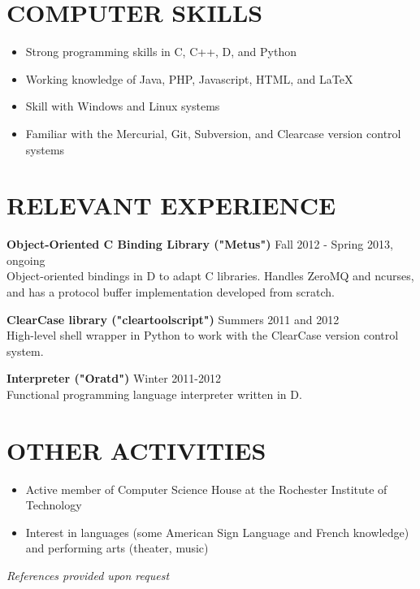 \documentclass[line]{res}
\begin{document}
\begin{resume}
\section{COMPUTER SKILLS}

	\begin{itemize}[leftmargin=10pt]
	\item Strong programming skills in C, C++, D, and Python
	\item Working knowledge of Java, PHP, Javascript, HTML, and LaTeX
	\item Skill with Windows and Linux systems
	\item Familiar with the Mercurial, Git, Subversion, and Clearcase version control systems
	\end{itemize}

\section{RELEVANT EXPERIENCE}

	\textbf{Object-Oriented C Binding Library ("Metus")}
	\hfill
	Fall 2012 - Spring 2013, ongoing
	\\
	Object-oriented bindings in D to adapt C libraries. Handles ZeroMQ and ncurses, and has a protocol buffer implementation developed from scratch.
	
	\textbf{ClearCase library ("cleartoolscript")}
	\hfill
	Summers 2011 and 2012
	\\
	High-level shell wrapper in Python to work with the ClearCase version control system.
	
	\textbf{Interpreter ("Oratd")}
	\hfill
	Winter 2011-2012
	\\
	Functional programming language interpreter written in D.

\section{OTHER ACTIVITIES}
	\begin{itemize}[leftmargin=10pt]
	\item Active member of Computer Science House at the Rochester Institute of Technology
	\item Interest in languages (some American Sign Language and French knowledge) and performing arts (theater, music)
	\end{itemize}

\begin{center}
\vspace{-0.26in}\hspace{-0.8in}\emph{References provided upon request\\[8pt]}
\end{center}

\end{resume}
\end{document}
